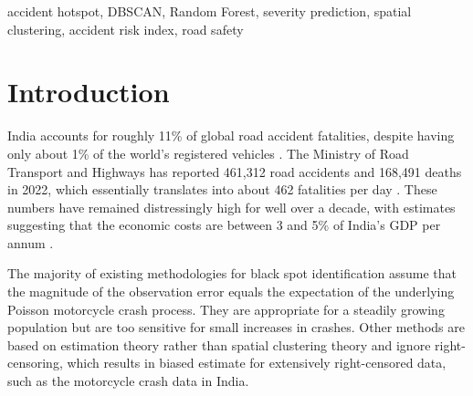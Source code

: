 \documentclass[conference]{IEEEtran}
\begin{document}
\begin{abstract}
Traffic accidents are a concerning issue in India. Over 150,000 fatalities are reported each year. In this paper, we propose an integrated pipeline that combines DBSCAN spatial clustering with Random Forest classification. The former monitors accident black spots, while the latter predicts accident severity. We leverage 12,316 Indian road accident records and 17 engineered features.DBSCAN with haversine distance and $\varepsilon = 0.045$ radians identifies 9 accident clusters. The Random Forest model, trained with 200 estimators and balanced class weighting, reaches 84.66\% test accuracy and a weighted F1-score of 0.7793. Five-fold stratified cross-validation gives a mean accuracy of 84.76\%. An ensemble of gradient-boosted trees predicts crashes using traffic volume, sociodemographic, and roadway infrastructure data. A separate gradient-boosted model predicts crash severity using crash, traffic volume, and sociodemographic data. An ARI combines the predictions and weights the severity using the cell’s average crash rate from the previous 5 years.
\end{abstract}

\begin{IEEEkeywords}
accident hotspot, DBSCAN, Random Forest, severity prediction, spatial clustering, accident risk index, road safety
\end{IEEEkeywords}

\section{Introduction}

India accounts for roughly 11\% of global road accident fatalities, despite having only about 1\% of the world's registered vehicles \cite{b1}. The Ministry of Road Transport and Highways has reported 461,312 road accidents and 168,491 deaths in 2022, which essentially translates into about 462 fatalities per day \cite{b2}. These numbers have remained distressingly high for well over a decade, with estimates suggesting that the economic costs are between 3 and 5\% of India’s GDP per annum \cite{b3}.

The majority of existing methodologies for black spot identification assume that the magnitude of the observation error equals the expectation of the underlying Poisson motorcycle crash process. They are appropriate for a steadily growing population but are too sensitive for small increases in crashes. Other methods are based on estimation theory rather than spatial clustering theory and ignore right-censoring, which results in biased estimate for extensively right-censored data, such as the motorcycle crash data in India.
\end{document}
